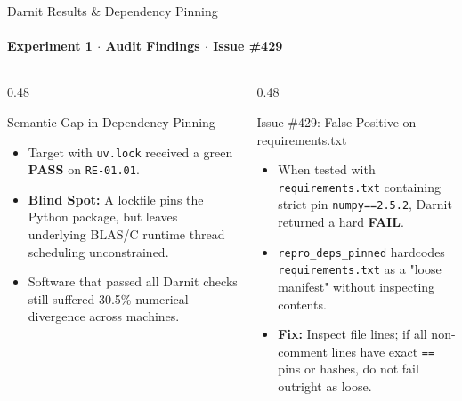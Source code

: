 \documentclass[aspectratio=169]{beamer}
\begin{document}
\begin{frame}{Darnit Results \& Dependency Pinning}
    \framesubtitle{Experiment 1 $\cdot$ Audit Findings $\cdot$ Issue \#429}
    \begin{columns}[T]
        \begin{column}{0.48\textwidth}
            \begin{block}{Semantic Gap in Dependency Pinning}
                \small
                \begin{itemize}
                    \item Target with \texttt{uv.lock} received a green \textbf{PASS} on \texttt{RE-01.01}.
                    \item \textbf{Blind Spot:} A lockfile pins the Python package, but leaves underlying BLAS/C runtime thread scheduling unconstrained.
                    \item Software that passed all Darnit checks still suffered 30.5\% numerical divergence across machines.
                \end{itemize}
            \end{block}
        \end{column}
        \begin{column}{0.48\textwidth}
            \begin{alertblock}{Issue \#429: False Positive on requirements.txt}
                \small
                \begin{itemize}
                    \item When tested with \texttt{requirements.txt} containing strict pin \texttt{numpy==2.5.2}, Darnit returned a hard \textbf{FAIL}.
                    \item \texttt{repro\_deps\_pinned} hardcodes \texttt{requirements.txt} as a "loose manifest" without inspecting contents.
                    \item \textbf{Fix:} Inspect file lines; if all non-comment lines have exact \texttt{==} pins or hashes, do not fail outright as loose.
                \end{itemize}
            \end{alertblock}
        \end{column}
    \end{columns}
\end{frame}
\end{document}
